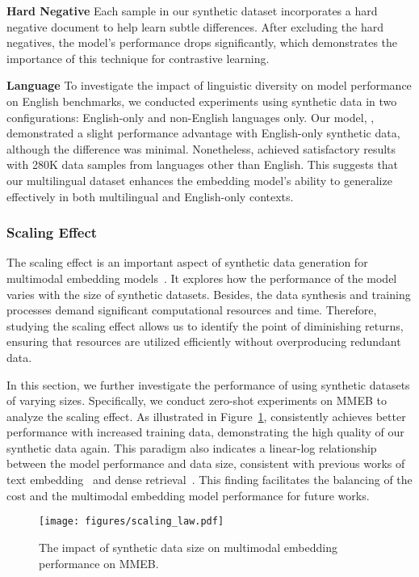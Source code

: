 \noindent \textbf{Hard Negative}
Each sample in our synthetic dataset incorporates a hard negative document to help \ours{} learn subtle differences.
After excluding the hard negatives, the model's performance drops significantly, which demonstrates the importance of this technique for contrastive learning.

\noindent \textbf{Language}
To investigate the impact of linguistic diversity on model performance on English benchmarks, we conducted experiments using synthetic data in two configurations: English-only and non-English languages only. 
Our model, \ours{}, demonstrated a slight performance advantage with English-only synthetic data, although the difference was minimal. 
Nonetheless, \ours{} achieved satisfactory results with 280K data samples from languages other than English. 
This suggests that our multilingual dataset enhances the embedding model's ability to generalize effectively in both multilingual and English-only contexts.


\subsubsection{Scaling Effect}


The scaling effect is an important aspect of synthetic data generation for multimodal embedding models~\cite{GME, megapairs}. 
It explores how the performance of the model varies with the size of synthetic datasets. 
Besides, the data synthesis and training processes demand significant computational resources and time.
Therefore, studying the scaling effect allows us to identify the point of diminishing returns, ensuring that resources are utilized efficiently without overproducing redundant data.

In this section, we further investigate the performance of \ours{} using synthetic datasets of varying sizes.
Specifically, we conduct zero-shot experiments on MMEB to analyze the scaling effect.
As illustrated in Figure~\ref{fig:scaling_law}, \ours{} consistently achieves better performance with increased training data, demonstrating the high quality of our synthetic data again.
This paradigm also indicates a linear-log relationship between the model performance and data size, consistent with previous works of text embedding~\cite{speed} and dense retrieval~\cite{scaling_ds}.
This finding facilitates the balancing of the cost and the multimodal embedding model performance for future works.



\begin{figure}[t]
\centering
\texttt{[image: figures/scaling\_law.pdf]}
\vspace{-2pt}
\caption{The impact of synthetic data size on multimodal embedding performance on MMEB.}
\label{fig:scaling_law} 
\end{figure}



